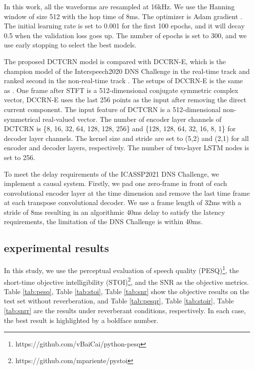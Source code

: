 \documentclass[journal,10pt]{IEEEtran}
\begin{document}
In this work, all the waveforms are resampled at 16kHz. We use the Hanning window of size 512 with the hop time of 8ms. The optimizer is Adam gradient \cite{kingma2014adam}. The initial learning rate is set to 0.001 for the first 100 epochs, and it will decay 0.5 when the validation loss goes up. The number of epochs is set to 300, and we use early stopping to select the best models.

The proposed DCTCRN model is compared with DCCRN-E, which is the champion model of the Interspeech2020 DNS Challenge in the real-time track and ranked second in the non-real-time track \cite{reddy2020interspeechresults}. The setups of DCCRN-E is the same as \cite{hu2020dccrn}. One frame after STFT is a 512-dimensional conjugate symmetric complex vector, DCCRN-E uses the last 256 points as the input after removing the direct current component. The input feature of DCTCRN is a 512-dimensional non-symmetrical real-valued vector. The number of encoder layer channels of DCTCRN is \{8, 16, 32, 64, 128, 128, 256\} and \{128, 128, 64, 32, 16, 8, 1\} for decoder layer channels. The kernel size and stride are set to (5,2) and (2,1) for all encoder and decoder layers, respectively. The number of two-layer LSTM nodes is set to 256.


To meet the delay requirements of the ICASSP2021 DNS Challenge, we implement a causal system. Firstly, we pad one zero-frame in front of each convolutional encoder layer at the time dimension and remove the last time frame at each transpose convolutional decoder. We use a frame length of 32ms with a stride of 8ms resulting in an algorithmic 40ms delay to satisfy the latency requirements, the limitation of the DNS Challenge is within 40ms.

\subsection{experimental results}

In this study, we use the perceptual evaluation of speech quality (PESQ)\footnote{https://github.com/vBaiCai/python-pesq}, the short-time objective intelligibility (STOI)\footnote{https://github.com/mpariente/pystoi}, and the SNR as the objective  metrics. Table \ref{tab:pesq}, Table \ref{tab:stoi}, Table \ref{tab:snr} show the objective results on the test set without reverberation, and Table \ref{tab:pesqr}, Table \ref{tab:stoir}, Table \ref{tab:snrr} are the results under reverberant conditions, respectively. In each case, the best result is highlighted by a boldface number.
\end{document}
